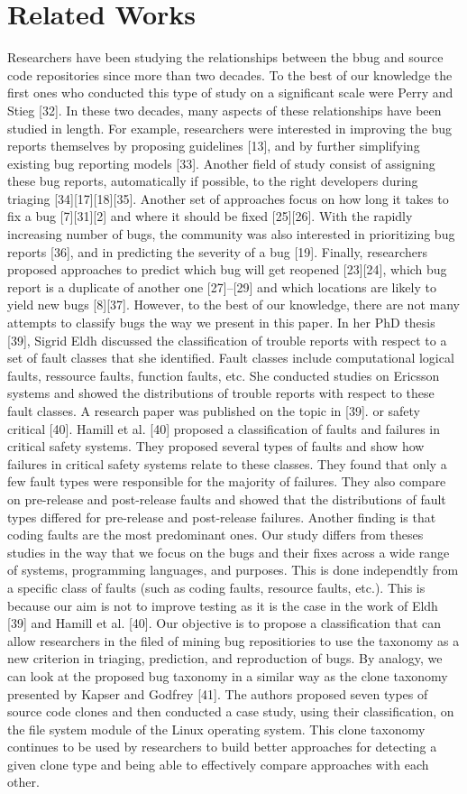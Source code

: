 \section{Related Works}

Researchers have been studying the relationships between
the bbug and source code repositories since more than two decades. To the best of our knowledge the first ones who conducted this type of study on a significant scale were Perry and Stieg [32]. In these two decades, many aspects of these relationships have been studied in length. For example, researchers were interested in improving the bug reports themselves by proposing guidelines [13], and by further simplifying existing bug reporting models [33]. Another field of study consist of assigning these bug reports, automatically if possible, to the right developers during triaging [34][17][18][35]. Another set of approaches focus on how long it takes to fix a bug [7][31][2] and where it should be fixed [25][26]. With the rapidly increasing number of bugs, the community was also interested in prioritizing bug reports [36], and in predicting the severity of a bug [19]. Finally, researchers proposed approaches to predict which bug will get reopened [23][24], which bug report is a duplicate of another one [27]–[29] and which locations are likely to yield new bugs [8][37]. However, to the best of our knowledge, there are not many attempts to classify bugs the way we present in this paper. In her PhD thesis [39], Sigrid Eldh discussed the classification of trouble reports with respect to a set of fault classes that she identified. Fault classes include computational logical faults, ressource faults, function faults, etc. She conducted studies on Ericsson systems and showed the distributions of trouble reports with respect to these fault classes. A research paper was published on the topic in [39]. or safety critical [40]. Hamill et al. [40] proposed a classification of faults and failures in critical safety systems. They proposed several types of faults and show how failures in critical safety systems relate to these classes. They found that only a few fault types were responsible for the majority of failures. They also compare on pre-release and post-release faults and showed that the distributions of fault types differed for pre-release and post-release failures. Another finding is that coding faults are the most predominant ones. Our study differs from theses studies in the way that we focus on the bugs and their fixes across a wide range of systems, programming languages, and purposes. This is done independtly from a specific class of faults (such as coding faults, resource faults, etc.). This is because our aim is not to improve testing as it is the case in the work of Eldh [39] and Hamill et al. [40]. Our objective is to propose a classification that can allow researchers in the filed of mining bug repositiories to use the taxonomy as a new criterion in triaging, prediction, and reproduction of bugs. By analogy, we can look at the proposed bug taxonomy in a similar way as the clone taxonomy presented by Kapser and Godfrey [41]. The authors proposed seven types of source code clones and then conducted a case study, using their classification, on the file system module of the Linux operating system. This clone taxonomy continues to be used by researchers to build better approaches for detecting a given clone type and being able to effectively compare approaches with each other.
